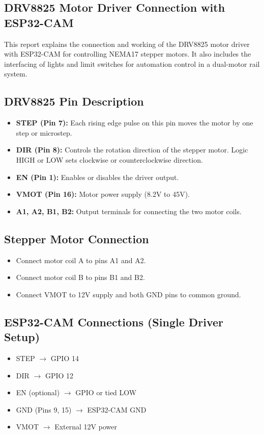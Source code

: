\documentclass[../weekly]{subfiles}
\begin{document}

\subsection{DRV8825 Motor Driver Connection with ESP32-CAM}

This report explains the connection and working of the DRV8825 motor driver with ESP32-CAM for controlling NEMA17 stepper motors. It also includes the interfacing of lights and limit switches for automation control in a dual-motor rail system.

\subsection{DRV8825 Pin Description}
\begin{itemize}
    \item \textbf{STEP (Pin 7):} Each rising edge pulse on this pin moves the motor by one step or microstep.
    \item \textbf{DIR (Pin 8):} Controls the rotation direction of the stepper motor. Logic HIGH or LOW sets clockwise or counterclockwise direction.
    \item \textbf{EN (Pin 1):} Enables or disables the driver output.
    \item \textbf{VMOT (Pin 16):} Motor power supply (8.2V to 45V).
    \item \textbf{A1, A2, B1, B2:} Output terminals for connecting the two motor coils.
\end{itemize}

\subsection{Stepper Motor Connection}
\begin{itemize}
    \item Connect motor coil A to pins A1 and A2.
    \item Connect motor coil B to pins B1 and B2.
    \item Connect VMOT to 12V supply and both GND pins to common ground.
\end{itemize}

\subsection{ESP32-CAM Connections (Single Driver Setup)}
\begin{itemize}
    \item STEP $\rightarrow$ GPIO 14
    \item DIR $\rightarrow$ GPIO 12
    \item EN (optional) $\rightarrow$ GPIO or tied LOW
    \item GND (Pins 9, 15) $\rightarrow$ ESP32-CAM GND
    \item VMOT $\rightarrow$ External 12V power
\end{itemize}
\end{document}

